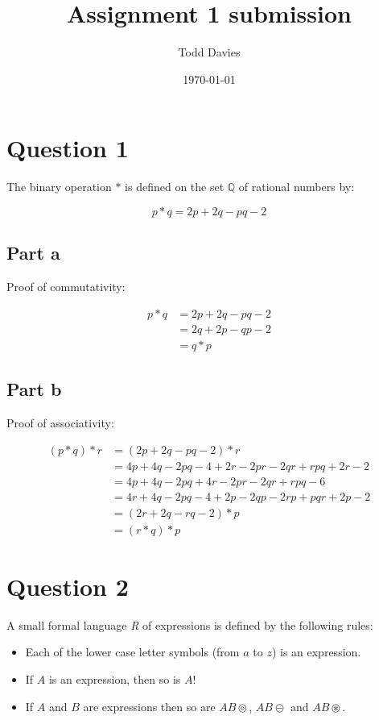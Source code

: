 \documentclass{article}
\author{Todd Davies}
\title{Assignment 1 submission}
\date{\today}
\begin{document}
\lhead{\today}

\maketitle

\section*{Question 1}

The binary operation $*$ is defined on the set $\mathbb{Q}$ of rational numbers by:

\[
    p * q = 2p + 2q - pq - 2
\]

\subsection*{Part a}

Proof of commutativity:

\[
    \begin{split}
    p * q &= 2p + 2q - pq -2\\
          &= 2q + 2p - qp - 2\\
          &= q * p
    \end{split}
\]

\subsection*{Part b}

Proof of associativity:

\[
    \begin{split}
    (p * q) * r &= (2p + 2q - pq -2) * r\\
                &= 4p + 4q - 2pq - 4 + 2r - 2pr - 2qr + rpq + 2r - 2\\
                &= 4p + 4q - 2pq + 4r - 2pr - 2qr + rpq - 6\\
                &= 4r + 4q - 2pq - 4 + 2p - 2qp - 2rp + pqr + 2p -2\\
                &= (2r + 2q - rq - 2) * p\\
                &= (r * q) * p
    \end{split}
\]

\section*{Question 2}

A small formal language {\it R} of expressions is defined by the following rules:
\begin{itemize}

    \item Each of the lower case letter symbols (from $a$ to $z$) is an expression.
    \item If $A$ is an expression, then so is $A!$
    \item If $A$ and $B$ are expressions then so are $AB\circledcirc$, $AB\circleddash$ and $AB\circledast$.

\end{itemize}
\end{document}
